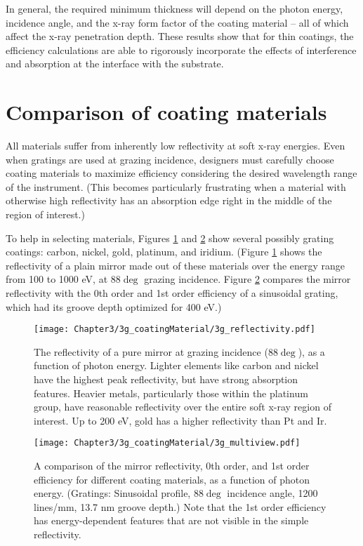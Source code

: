 In general, the required minimum thickness will depend on the photon energy, incidence angle, and the x-ray form factor of the coating material -- all of which affect the x-ray penetration depth.  These results show that for thin coatings, the efficiency calculations are able to rigorously incorporate the effects of interference and absorption at the interface with the substrate.

\section{Comparison of coating materials}
All materials suffer from inherently low reflectivity at soft x-ray energies.  Even when gratings are used at grazing incidence, designers must carefully choose coating materials to maximize efficiency considering the desired wavelength range of the instrument.  (This becomes particularly frustrating when a material with otherwise high reflectivity has an absorption edge right in the middle of the region of interest.)

To help in selecting materials, Figures \ref{3g} and \ref{3g-2} show several possibly grating coatings: carbon, nickel, gold, platinum, and iridium.  (Figure \ref{3g} shows the reflectivity of a plain mirror made out of these materials over the energy range from 100 to  1000 eV, at 88$\deg$ grazing incidence.  Figure \ref{3g-2} compares the mirror reflectivity with the 0th order and 1st order efficiency of a sinusoidal grating, which had its groove depth optimized for 400 eV.)

\begin{figure}[htbp] %
   \centering
   \texttt{[image: Chapter3/3g\_coatingMaterial/3g\_reflectivity.pdf]} 
   \caption[The reflectivity of a pure mirror at grazing incidence (88$\deg$), as a function of photon energy.]{The reflectivity of a pure mirror at grazing incidence (88$\deg$), as a function of photon energy.  Lighter elements like carbon and nickel have the highest peak reflectivity, but have strong absorption features.  Heavier metals, particularly those within the platinum group, have reasonable reflectivity over the entire soft x-ray region of interest.  Up to 200 eV, gold has a higher reflectivity than Pt and Ir. }
   \label{3g}
\end{figure}

\begin{figure}[htbp] %
   \centering
   \texttt{[image: Chapter3/3g\_coatingMaterial/3g\_multiview.pdf]} 
   \caption[A comparison of the mirror reflectivity, 0th order, and 1st order efficiency for different coating materials, as a function of photon energy.]{A comparison of the mirror reflectivity, 0th order, and 1st order efficiency for different coating materials, as a function of photon energy.  (Gratings: Sinusoidal profile, 88$\deg$ incidence angle, 1200 lines/mm, 13.7 nm groove depth.)  Note that the 1st order efficiency has energy-dependent features that are not visible in the simple reflectivity.}
   \label{3g-2}
\end{figure}

